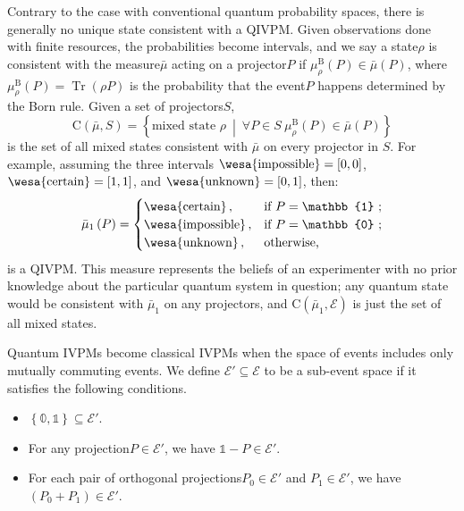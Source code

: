 \documentclass[english,reprint, aps, prl,superscriptaddress, showpacs,
showkeys, longbibliography, amsmath, amssymb]{revtex4-1}
\theoremstyle{plain}
\theoremstyle{definition}
\newcommand{\events}{\ensuremath{\mathcal{E}}}
\newcommand{\imposs}{{\text{\wesa{impossible}}}}
\newcommand{\necess}{{\text{\wesa{certain}}}}
\newcommand{\unknown}{{\text{\wesa{unknown}}}}
\newcommand{\set}[2]{\ensuremath{\left\{ {#1}~\middle|~{#2}\right\} }}
\newcommand{\Tr}{\ensuremath{\mathop{\mathrm{Tr}}\nolimits}}
\newcommand{\coreBorn}{\ensuremath{\mathrm{C}}}
\newcommand{\nb}{\nolinebreak[1] }
\begin{document}
Contrary to the case with conventional quantum probability spaces,
there is generally no unique state consistent with a QIVPM. Given
observations done with finite resources, the probabilities become
intervals, and we say a state\nb$\rho$ is consistent with the
measure\nb$\bar{\mu}$ acting on a projector\nb$P$ if
$\mu_{\rho}^{\mathrm{B}}\left(P\right)\in\bar{\mu}\left(P\right)$,
where $\mu_{\rho}^{\mathrm{B}}\left(P\right)=\Tr\left(\rho P\right)$
is the probability that the event\nb$P$ happens determined by the
Born rule\nb\citep{Born1983,peres1995quantum,544199}. Given a set
of projectors\nb$S$, 
\begin{equation}
\coreBorn\left(\bar{\mu},S\right)=\set{\textrm{mixed state }\rho}{\forall P\in S\ \mu_{\rho}^{\mathrm{B}}\left(P\right)\in\bar{\mu}\left(P\right)}
\end{equation}
is the set of all mixed states consistent with $\bar{\mu}$ on every
projector in $S$. For example, assuming the three intervals $\imposs=\left[0,0\right]$,
$\necess=\left[1,1\right]$, and $\unknown=\left[0,1\right]$, then:
\begin{equation}
\bar{\mu}_{1}\left(P\right)=\begin{cases}
\necess\,, & \text{if }P=\mathbb{1}\text{ ;}\\
\imposs\,, & \text{if }P=\mathbb{0}\text{ ;}\\
\unknown\,, & \text{otherwise,}
\end{cases}\label{eq:no-information-IVPM}
\end{equation}
is a QIVPM. This measure represents the beliefs of an experimenter
with no prior knowledge about the particular quantum system in question;
any quantum state would be consistent with $\bar{\mu}_{1}$ on any
projectors, and $\coreBorn\left(\bar{\mu}_{1},\events\right)$ is
just the set of all mixed states.

Quantum IVPMs become classical IVPMs when the space of events includes
only mutually commuting events. We define $\events'\subseteq\events$
to be a sub-event space if it satisfies the following conditions.
\begin{itemize}
\item $\left\{ \mathbb{0},\mathbb{1}\right\} \subseteq\events'$.
\item For any projection\nb$P\in\events'$, we have $\mathbb{1}-P\in\events'$. 
\item For each pair of orthogonal projections\nb$P_0 \in \events'$ and
  $P_1 \in \events'$, we have $(P_0 + P_1) \in \events'$. 
\end{itemize}
\end{document}
